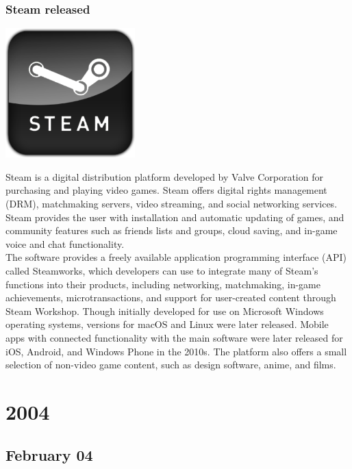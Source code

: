 \documentclass[11pt]{report}
\begin{document}
\subsection{Steam released}
\vspace{2mm}\begin{center}\includegraphics[width=5cm]{./img/1ststeamlogo.png}\end{center}
Steam is a digital distribution platform developed by Valve Corporation for purchasing and playing video games. Steam offers digital rights management (DRM), matchmaking servers, video streaming, and social networking services. Steam provides the user with installation and automatic updating of games, and community features such as friends lists and groups, cloud saving, and in-game voice and chat functionality.\\
The software provides a freely available application programming interface (API) called Steamworks, which developers can use to integrate many of Steam's functions into their products, including networking, matchmaking, in-game achievements, microtransactions, and support for user-created content through Steam Workshop. Though initially developed for use on Microsoft Windows operating systems, versions for macOS and Linux were later released. Mobile apps with connected functionality with the main software were later released for iOS, Android, and Windows Phone in the 2010s. The platform also offers a small selection of non-video game content, such as design software, anime, and films.

\chapter{2004}
\section{February 04}
\end{document}
